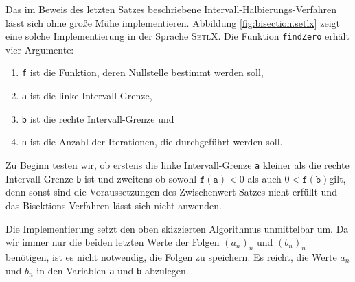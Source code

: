\noindent
Das im Beweis des letzten Satzes beschriebene Intervall-Halbierungs-Verfahren l\"asst sich
ohne gro{\ss}e M\"uhe  implementieren.  Abbildung \ref{fig:bisection.setlx}
zeigt eine solche Implementierung in der Sprache \textsc{SetlX}.  Die Funktion \texttt{findZero}
erh\"alt vier Argumente:
\begin{enumerate}
\item \texttt{f} ist die Funktion, deren Nullstelle bestimmt werden soll,
\item \texttt{a} ist die linke Intervall-Grenze, 
\item \texttt{b} ist die rechte Intervall-Grenze und
\item \texttt{n} ist die Anzahl der Iterationen, die durchgef\"uhrt werden soll.
\end{enumerate}
Zu Beginn testen wir, ob erstens die linke Intervall-Grenze \texttt{a} kleiner als die rechte
Intervall-Grenze \texttt{b} ist und zweitens ob sowohl $\mathtt{f(a)} < 0$ als auch $0 < \mathtt{f(b)}$gilt, denn sonst sind
die Voraussetzungen des Zwischenwert-Satzes nicht erf\"ullt und das Bisektions-Verfahren l\"asst
sich nicht anwenden. 

Die Implementierung setzt den oben skizzierten Algorithmus unmittelbar um.  Da wir immer nur die
beiden letzten Werte der Folgen $(a_n)_n$ und $(b_n)_n$ ben\"otigen, ist es nicht notwendig, die
Folgen zu speichern.  Es reicht, die Werte $a_n$ und $b_n$ in den Variablen \texttt{a} und
\texttt{b} abzulegen. 

